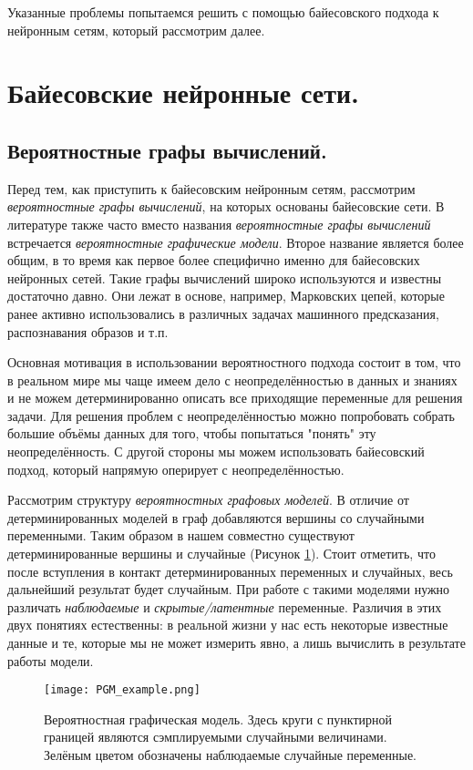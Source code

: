 Указанные проблемы попытаемся решить с помощью байесовского подхода к нейронным сетям, который
 рассмотрим далее.

\section{Байесовские нейронные сети.}
\subsection{Вероятностные графы вычислений.}

Перед тем, как приступить к байесовским нейронным сетям, рассмотрим \textit{вероятностные графы вычислений}, на которых основаны
 байесовские сети. В литературе также часто вместо названия \textit{вероятностные графы вычислений} встречается \textit{вероятностные графические модели}.
 Второе название является более общим, в то время как первое более специфично именно для байесовских нейронных сетей.
 Такие графы вычислений широко используются и известны достаточно давно. Они лежат в основе, например,
 Марковских цепей, которые ранее активно использовались в различных задачах машинного предсказания, распознавания образов и т.п.

Основная мотивация в использовании вероятностного подхода состоит в том, что в реальном мире мы чаще имеем дело с неопределённостью в данных и знаниях
 и не можем детерминированно описать все приходящие переменные для решения задачи. Для решения проблем с неопределённостью
 можно попробовать собрать большие объёмы данных для того, чтобы попытаться "понять" эту неопределённость. С другой стороны
 мы можем использовать байесовский подход, который напрямую оперирует с неопределённостью.

Рассмотрим структуру \textit{вероятностных графовых моделей}. В отличие от детерминированных моделей в граф добавляются вершины
 со случайными переменными. Таким образом в нашем совместно существуют детерминированные вершины и случайные (Рисунок \ref{fig:PGM_example}). Стоит отметить,
 что после вступления в контакт детерминированных переменных и случайных, весь дальнейший результат будет случайным.
 При работе с такими моделями нужно различать \textit{наблюдаемые} и \textit{скрытые/латентные} переменные.
 Различия в этих двух понятиях естественны: в реальной жизни у нас есть некоторые известные данные и те, которые мы не может измерить явно,
 а лишь вычислить в результате работы модели.

\begin{figure}[H]
    \centering
    \texttt{[image: PGM\_example.png]}
    \caption{Вероятностная графическая модель. Здесь круги с пунктирной границей являются сэмплируемыми случайными величинами. Зелёным цветом обозначены наблюдаемые случайные переменные.}
    \label{fig:PGM_example}
\end{figure}

